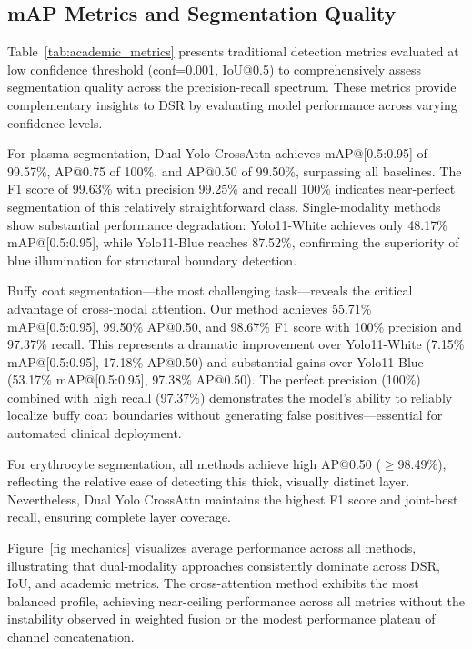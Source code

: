\documentclass[journal,twoside,web]{ieeecolor}
\begin{document}
\subsection{mAP Metrics and Segmentation Quality}

Table~\ref{tab:academic_metrics} presents traditional detection metrics evaluated at low confidence threshold (conf=0.001, IoU@0.5) to comprehensively assess segmentation quality across the precision-recall spectrum. These metrics provide complementary insights to DSR by evaluating model performance across varying confidence levels.

For plasma segmentation, Dual Yolo CrossAttn achieves mAP@[0.5:0.95] of 99.57\%, AP@0.75 of 100\%, and AP@0.50 of 99.50\%, surpassing all baselines. The F1 score of 99.63\% with precision 99.25\% and recall 100\% indicates near-perfect segmentation of this relatively straightforward class. Single-modality methods show substantial performance degradation: Yolo11-White achieves only 48.17\% mAP@[0.5:0.95], while Yolo11-Blue reaches 87.52\%, confirming the superiority of blue illumination for structural boundary detection.

Buffy coat segmentation—the most challenging task—reveals the critical advantage of cross-modal attention. Our method achieves 55.71\% mAP@[0.5:0.95], 99.50\% AP@0.50, and 98.67\% F1 score with 100\% precision and 97.37\% recall. This represents a dramatic improvement over Yolo11-White (7.15\% mAP@[0.5:0.95], 17.18\% AP@0.50) and substantial gains over Yolo11-Blue (53.17\% mAP@[0.5:0.95], 97.38\% AP@0.50). The perfect precision (100\%) combined with high recall (97.37\%) demonstrates the model's ability to reliably localize buffy coat boundaries without generating false positives—essential for automated clinical deployment.

For erythrocyte segmentation, all methods achieve high AP@0.50 ($\geq$98.49\%), reflecting the relative ease of detecting this thick, visually distinct layer. Nevertheless, Dual Yolo CrossAttn maintains the highest F1 score and joint-best recall, ensuring complete layer coverage.

Figure~\ref{fig mechanics} visualizes average performance across all methods, illustrating that dual-modality approaches consistently dominate across DSR, IoU, and academic metrics. The cross-attention method exhibits the most balanced profile, achieving near-ceiling performance across all metrics without the instability observed in weighted fusion or the modest performance plateau of channel concatenation.
\end{document}
